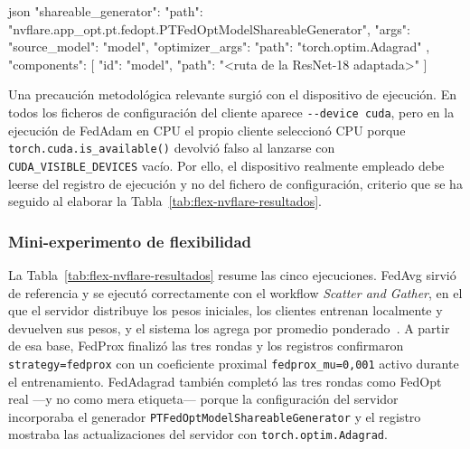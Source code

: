 \begin{codigo}[title={Fragmento representativo de config\_fed\_server.conf (FedOpt)}, label={cod:nvflare-fedopt}, list entry={\protect\numberline{\thelisting}Configuración FedOpt del servidor en NVIDIA FLARE (config\_fed\_server.conf)}]{json}
"shareable_generator": {
  "path": "nvflare.app_opt.pt.fedopt.PTFedOptModelShareableGenerator",
  "args": {
    "source_model": "model",
    "optimizer_args": { "path": "torch.optim.Adagrad" }
  }
},
"components": [
  { "id": "model", "path": "<ruta de la ResNet-18 adaptada>" }
]
\end{codigo}

Una precaución metodológica relevante surgió con el dispositivo de ejecución. En
todos los ficheros de configuración del cliente aparece \texttt{-{}-device cuda},
pero en la ejecución de FedAdam en CPU el propio cliente seleccionó CPU porque
\texttt{torch.cuda.is_available()} devolvió falso al lanzarse con
\texttt{CUDA\_\allowbreak VISIBLE\_\allowbreak DEVICES} vacío. Por ello, el dispositivo realmente empleado
debe leerse del registro de ejecución y no del fichero de configuración, criterio
que se ha seguido al elaborar la Tabla~\ref{tab:flex-nvflare-resultados}.

\subsubsection{Mini-experimento de flexibilidad}\label{subsec:flex-nvflare-mini}

La Tabla~\ref{tab:flex-nvflare-resultados} resume las cinco ejecuciones. FedAvg
sirvió de referencia y se ejecutó correctamente con el workflow \textit{Scatter and
Gather}, en el que el servidor distribuye los pesos iniciales, los clientes
entrenan localmente y devuelven sus pesos, y el sistema los agrega por promedio
ponderado~\parencite{nvflareAlgorithms}. A partir de esa base, FedProx finalizó las
tres rondas y los registros confirmaron \texttt{strategy=fedprox} con un coeficiente
proximal \texttt{fedprox\_\allowbreak mu=0,001} activo durante el entrenamiento. FedAdagrad
también completó las tres rondas como FedOpt real —y no como mera etiqueta— porque
la configuración del servidor incorporaba el generador
\texttt{PTFedOptModelShareableGenerator} y el registro mostraba las
actualizaciones del servidor con \texttt{torch.optim.Adagrad}.

